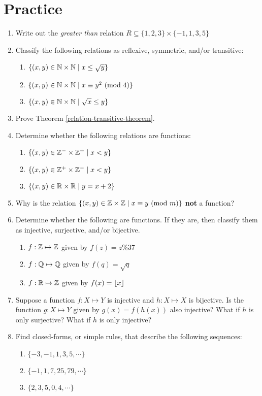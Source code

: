 \documentclass[main.tex]{subfiles}
\begin{document}
\section{Practice}

\begin{enumerate}
	\item Write out the \textit{greater than} relation \(R \subseteq \{1,2,3\} \times \{-1,1,3,5\}\)
	\item Classify the following relations as reflexive, symmetric, and/or transitive:
	\begin{enumerate}
		\item \(\{(x,y) \in \mathbb{N} \times \mathbb{N} \mid x \leq \sqrt{y}\}\)
		\item \(\{(x,y) \in \mathbb{N} \times \mathbb{N} \mid x \equiv y^2 \ (\mathrm{mod}\ 4)\}\)
		\item \(\{(x,y) \in \mathbb{N} \times \mathbb{N} \mid \sqrt{x} \leq y\}\)
	\end{enumerate}
	\item Prove Theorem \ref{relation-transitive-theorem}.
	\item Determine whether the following relations are functions:
	\begin{enumerate}
		\item \(\{(x,y) \in \mathbb{Z}^- \times \mathbb{Z}^+ \mid x < y\}\)
		\item \(\{(x,y) \in \mathbb{Z}^+ \times \mathbb{Z}^- \mid x < y\}\)
		\item \(\{(x,y) \in \mathbb{R} \times \mathbb{R} \mid y = x + 2\}\)
	\end{enumerate}
	\item Why is the relation \(\{(x,y) \in \mathbb{Z} \times \mathbb{Z} \mid x \equiv y \ (\mathrm{mod}\ m)\}\) \textbf{not} a function?
	\item Determine whether the following are functions. If they are, then classify them as injective, surjective, and/or bijective.
	\begin{enumerate}
		\item \(f : \mathbb{Z} \mapsto \mathbb{Z}\) given by \(f(z) = z \% 37\)
		\item \(f : \mathbb{Q} \mapsto \mathbb{Q}\) given by \(f(q) = \sqrt{q}\)
		\item \(f : \mathbb{R} \mapsto \mathbb{Z}\) given by \(f(x) = \lfloor x\rfloor\)
	\end{enumerate}
	\item Suppose a function \(f : X \mapsto Y\) is injective and \(h : X \mapsto X\) is bijective. Is the function \(g : X \mapsto Y\) given by \(g(x) = f(h(x))\) also injective? What if \(h\) is only surjective? What if \(h\) is only injective? %
	\item Find closed-forms, or simple rules, that describe the following sequences:
	\begin{enumerate}
		\item \(\{-3,-1,1,3,5,\cdots\}\) %
		\item \(\{-1, 1, 7, 25, 79, \cdots\}\) %
		\item \(\{2,3,5,0,4,\cdots\}\) %
	\end{enumerate}
\end{enumerate}
\end{document}

